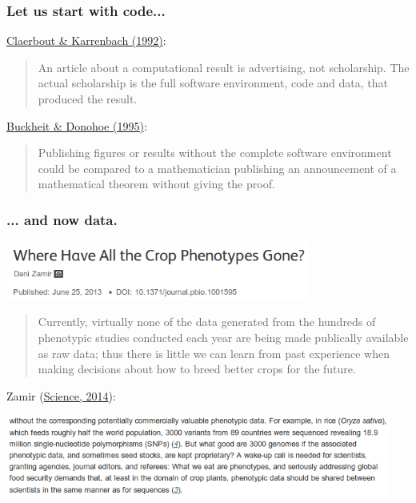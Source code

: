 \documentclass[c]{beamer} %
\begin{document}
\begin{frame}
  \frametitle{Let us start with code...}
  \href{https://doi.org/10.1190/1.1822162}{Claerbout \& Karrenbach (1992)}:
  \begin{quote}
    An article about a computational result is advertising, not scholarship. The actual scholarship is the full software environment, code and data, that produced the result.
  \end{quote}
  
  \bigskip
  \pause
  
  \href{https://doi.org/10.1007/978-1-4612-2544-7_5}{Buckheit \& Donohoe (1995)}:
  \begin{quote}
    Publishing figures or results without the complete software environment could be compared to a mathematician publishing an announcement of a mathematical theorem without giving the proof.
  \end{quote}
\end{frame}

\begin{frame}
  \frametitle{... and now data.}
  \begin{center}
    \includegraphics[width=0.75\textwidth,height=0.90\textheight,keepaspectratio=true]{2013-06_DZamir_title}%
  \end{center}
  \pause
  \begin{quote}
    Currently, virtually none of the data generated from the hundreds of phenotypic studies conducted each year are being made publically available as raw data; thus there is little we can learn from past experience when making decisions about how to breed better crops for the future.
  \end{quote}
  
  \bigskip
  \pause
  
  Zamir (\href{http://dx.doi.org/10.1126/science.1258941}{Science, 2014}):
  \begin{center}
    \includegraphics[width=0.95\textwidth,height=0.90\textheight,keepaspectratio=true]{2014-09_DZamir_text}%
  \end{center}
\end{frame}
\end{document}
